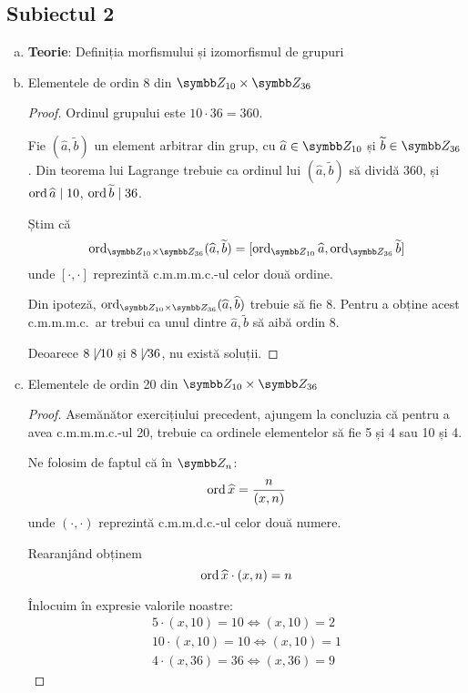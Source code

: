 \subsection*{Subiectul 2}
\begin{enumerate}[(a)]
    \item \textbf{Teorie}: Definiția morfismului și izomorfismul de grupuri

    \item Elementele de ordin 8 din \(\integersmod{10} \times \integersmod{36}\)
    \begin{proof}
    Ordinul grupului este \(10 \cdot 36 = 360\).

    Fie \((\widehat{a}, \widetilde{b})\) un element arbitrar din grup, cu \(\widehat{a} \in \integersmod{10}\) și \(\widetilde{b} \in \integersmod{36}\). Din teorema lui Lagrange trebuie ca ordinul lui \((\widehat{a}, \widetilde{b})\) să dividă 360, și \(\operatorname{ord} \widehat{a} \mid 10\), \(\operatorname{ord} \widetilde{b} \mid 36\).

    Știm că
    \[
    \ord_{\integersmod{10} \times \integersmod{36}} (\widehat{a}, \widetilde{b}) = [\ord_{\integersmod{10}} \widehat{a}, \ord_{\integersmod{36}} \widetilde{b}]
    \]
    unde \([ \cdot, \cdot ]\) reprezintă c.m.m.m.c.-ul celor două ordine.

    Din ipoteză, \(\ord_{\integersmod{10} \times \integersmod{36}} (\widehat{a}, \widehat{b})\) trebuie să fie 8. Pentru a obține acest c.m.m.m.c.~ar trebui ca unul dintre \(\widehat{a}, \widetilde{b}\) să aibă ordin 8.

    Deoarece \(8 \not \mid 10\) și \(8 \not\mid 36\), nu există soluții.
    \end{proof}

    \item Elementele de ordin 20 din \(\integersmod{10} \times \integersmod{36}\)
    \begin{proof}
    Asemănător exercițiului precedent, ajungem la concluzia că pentru a avea c.m.m.m.c.-ul 20, trebuie ca ordinele elementelor să fie 5 și 4 sau 10 și 4.

    Ne folosim de faptul că în \(\integersmod{n}\):
    \[
        \operatorname{ord} \widehat{x} = \frac{n}{(x, n)}
    \]
    unde \((\cdot, \cdot)\) reprezintă c.m.m.d.c.-ul celor două numere.

    Rearanjând obținem
    \[
        \operatorname{ord} \widehat{x} \cdot (x, n) = n
    \]

    Înlocuim în expresie valorile noastre:
    \begin{align*}
        5 \cdot (x, 10) = 10 \iff (x, 10) = 2 \\
        10 \cdot (x, 10) = 10 \iff (x, 10) = 1 \\
        4 \cdot (x, 36) = 36 \iff (x, 36) = 9
    \end{align*}


\end{proof}
\end{enumerate}
